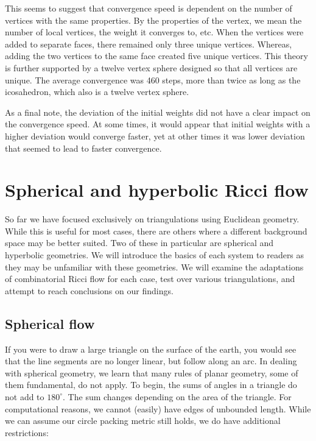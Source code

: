 \documentclass[12pt]{article}
\begin{document}
 This seems to suggest that convergence speed is dependent on the number of vertices with the same properties. By the properties of the vertex, we mean the number of local vertices, the weight it converges to, etc. When the vertices were added to separate faces, there remained only three unique vertices. Whereas, adding the two vertices to the same face created five unique vertices. This theory is further supported by a twelve vertex sphere designed so that all vertices are unique. The average convergence was 460 steps, more than twice as long as the icosahedron, which also is a twelve vertex sphere.

 As a final note, the deviation of the initial weights did not have a clear impact on the convergence speed. At some times, it would appear that initial weights with a higher deviation would converge faster, yet at other times it was lower deviation that seemed to lead to faster convergence.

\section{Spherical and hyperbolic Ricci flow}
\label{HypSphere}

So far we have focused exclusively on triangulations using Euclidean geometry. While this is useful for most cases, there are others where a different background space may be better suited. Two of these in particular are spherical and hyperbolic geometries. We will introduce the basics of each system to readers as they may be unfamiliar with these geometries. We will examine the adaptations of combinatorial Ricci flow for each case, test over various triangulations, and attempt to reach conclusions on our findings. 

\subsection{Spherical flow}
If you were to draw a large triangle on the surface of the earth, you would see that the line segments are no longer linear, but follow along an arc. In dealing with spherical geometry, we learn that many rules of planar geometry, some of them fundamental, do not apply. To begin, the sums of angles in a triangle do not add to $180^\circ$. The sum changes depending on the area of the triangle. For computational reasons, we cannot (easily) have edges of unbounded length. While we can assume our circle packing metric still holds, we do have additional restrictions: 
\end{document}
